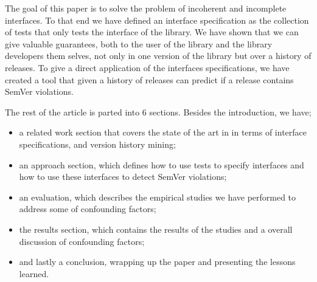 The goal of this paper is to solve the problem of incoherent and
incomplete interfaces. To that end we have defined an interface specification
as the collection of tests that only tests the interface of the library. We have
shown that we can give valuable guarantees, both to the user of the library and
the library developers them selves, not only in one version of the library but 
over a history of releases. To give a direct application of the interfaces 
specifications, we have created a tool that given a history of releases can
predict if a release contains SemVer violations. 

The rest of the article is parted into 6 sections. Besides the introduction, we
have; 
\begin{itemize}

    \item a related work section that covers the state of the art in in terms
    of interface specifications, and version history mining; 

    \item an approach section, which defines how to use tests to specify
    interfaces and how to use these interfaces to detect SemVer violations;

    \item an evaluation, which describes the empirical studies we have
    performed to address some of confounding factors;

    \item the results section, which contains the results of the studies and a
    overall discussion of confounding factors;

    \item and lastly a conclusion, wrapping up the paper and presenting the
    lessons learned.

\end{itemize}

%
